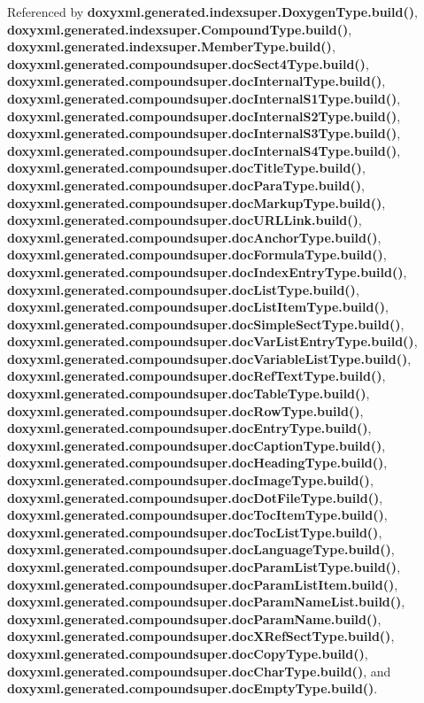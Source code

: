 Referenced by {\bf doxyxml.\+generated.\+indexsuper.\+Doxygen\+Type.\+build()}, {\bf doxyxml.\+generated.\+indexsuper.\+Compound\+Type.\+build()}, {\bf doxyxml.\+generated.\+indexsuper.\+Member\+Type.\+build()}, {\bf doxyxml.\+generated.\+compoundsuper.\+doc\+Sect4\+Type.\+build()}, {\bf doxyxml.\+generated.\+compoundsuper.\+doc\+Internal\+Type.\+build()}, {\bf doxyxml.\+generated.\+compoundsuper.\+doc\+Internal\+S1\+Type.\+build()}, {\bf doxyxml.\+generated.\+compoundsuper.\+doc\+Internal\+S2\+Type.\+build()}, {\bf doxyxml.\+generated.\+compoundsuper.\+doc\+Internal\+S3\+Type.\+build()}, {\bf doxyxml.\+generated.\+compoundsuper.\+doc\+Internal\+S4\+Type.\+build()}, {\bf doxyxml.\+generated.\+compoundsuper.\+doc\+Title\+Type.\+build()}, {\bf doxyxml.\+generated.\+compoundsuper.\+doc\+Para\+Type.\+build()}, {\bf doxyxml.\+generated.\+compoundsuper.\+doc\+Markup\+Type.\+build()}, {\bf doxyxml.\+generated.\+compoundsuper.\+doc\+U\+R\+L\+Link.\+build()}, {\bf doxyxml.\+generated.\+compoundsuper.\+doc\+Anchor\+Type.\+build()}, {\bf doxyxml.\+generated.\+compoundsuper.\+doc\+Formula\+Type.\+build()}, {\bf doxyxml.\+generated.\+compoundsuper.\+doc\+Index\+Entry\+Type.\+build()}, {\bf doxyxml.\+generated.\+compoundsuper.\+doc\+List\+Type.\+build()}, {\bf doxyxml.\+generated.\+compoundsuper.\+doc\+List\+Item\+Type.\+build()}, {\bf doxyxml.\+generated.\+compoundsuper.\+doc\+Simple\+Sect\+Type.\+build()}, {\bf doxyxml.\+generated.\+compoundsuper.\+doc\+Var\+List\+Entry\+Type.\+build()}, {\bf doxyxml.\+generated.\+compoundsuper.\+doc\+Variable\+List\+Type.\+build()}, {\bf doxyxml.\+generated.\+compoundsuper.\+doc\+Ref\+Text\+Type.\+build()}, {\bf doxyxml.\+generated.\+compoundsuper.\+doc\+Table\+Type.\+build()}, {\bf doxyxml.\+generated.\+compoundsuper.\+doc\+Row\+Type.\+build()}, {\bf doxyxml.\+generated.\+compoundsuper.\+doc\+Entry\+Type.\+build()}, {\bf doxyxml.\+generated.\+compoundsuper.\+doc\+Caption\+Type.\+build()}, {\bf doxyxml.\+generated.\+compoundsuper.\+doc\+Heading\+Type.\+build()}, {\bf doxyxml.\+generated.\+compoundsuper.\+doc\+Image\+Type.\+build()}, {\bf doxyxml.\+generated.\+compoundsuper.\+doc\+Dot\+File\+Type.\+build()}, {\bf doxyxml.\+generated.\+compoundsuper.\+doc\+Toc\+Item\+Type.\+build()}, {\bf doxyxml.\+generated.\+compoundsuper.\+doc\+Toc\+List\+Type.\+build()}, {\bf doxyxml.\+generated.\+compoundsuper.\+doc\+Language\+Type.\+build()}, {\bf doxyxml.\+generated.\+compoundsuper.\+doc\+Param\+List\+Type.\+build()}, {\bf doxyxml.\+generated.\+compoundsuper.\+doc\+Param\+List\+Item.\+build()}, {\bf doxyxml.\+generated.\+compoundsuper.\+doc\+Param\+Name\+List.\+build()}, {\bf doxyxml.\+generated.\+compoundsuper.\+doc\+Param\+Name.\+build()}, {\bf doxyxml.\+generated.\+compoundsuper.\+doc\+X\+Ref\+Sect\+Type.\+build()}, {\bf doxyxml.\+generated.\+compoundsuper.\+doc\+Copy\+Type.\+build()}, {\bf doxyxml.\+generated.\+compoundsuper.\+doc\+Char\+Type.\+build()}, and {\bf doxyxml.\+generated.\+compoundsuper.\+doc\+Empty\+Type.\+build()}.



